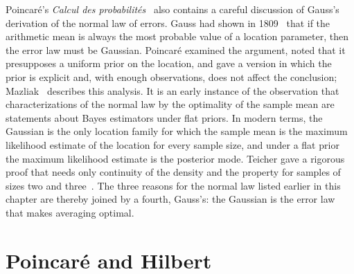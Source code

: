 Poincar\'e's \emph{Calcul des probabilit\'es}~\cite{poincare1912calcul} also contains a careful discussion of Gauss's derivation of the normal law of errors. Gauss had shown in 1809~\cite{gauss1809} that if the arithmetic mean is always the most probable value of a location parameter, then the error law must be Gaussian. Poincar\'e examined the argument, noted that it presupposes a uniform prior on the location, and gave a version in which the prior is explicit and, with enough observations, does not affect the conclusion; Mazliak~\cite{mazliak2012} describes this analysis. It is an early instance of the observation that characterizations of the normal law by the optimality of the sample mean are statements about Bayes estimators under flat priors. In modern terms, the Gaussian is the only location family for which the sample mean is the maximum likelihood estimate of the location for every sample size, and under a flat prior the maximum likelihood estimate is the posterior mode. Teicher gave a rigorous proof that needs only continuity of the density and the property for samples of sizes two and three~\cite{teicher1961}. The three reasons for the normal law listed earlier in this chapter are thereby joined by a fourth, Gauss's: the Gaussian is the error law that makes averaging optimal.

\section{Poincar\'e and Hilbert}


